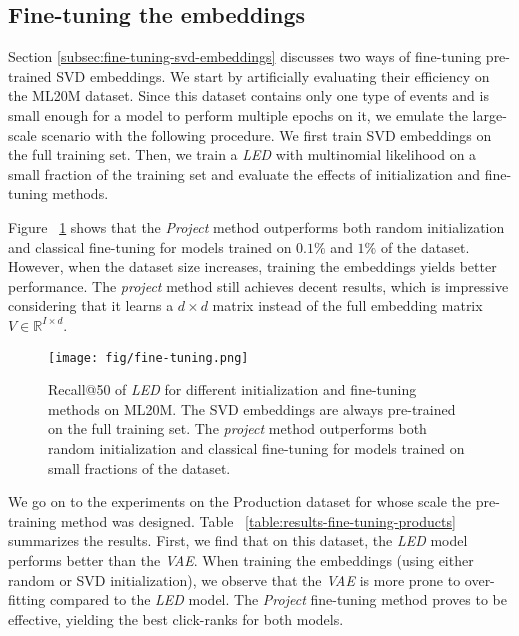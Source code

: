 \documentclass[sigconf]{acmart}
\begin{document}
\subsection{Fine-tuning the embeddings}
\label{sec:fine-tuning-results}
Section \ref{subsec:fine-tuning-svd-embeddings} discusses two ways of fine-tuning pre-trained SVD embeddings. We start by artificially evaluating their efficiency on the ML20M dataset. Since this dataset contains only one type of events and is small enough for a model to perform multiple epochs on it, we emulate the large-scale scenario with the following procedure. We first train SVD embeddings on the full training set. Then, we train a \emph{LED} with multinomial likelihood on a small fraction of the training set and evaluate the effects of initialization and fine-tuning methods.

Figure ~\ref{fig:fine-tuning} shows that the \emph{Project} method outperforms both random initialization and classical fine-tuning for models trained on $ 0.1 \% $ and $ 1 \% $ of the dataset. However, when the dataset size increases, training the embeddings yields better performance. The \emph{project} method still achieves decent results, which is impressive considering that it learns a $ d \times d $ matrix instead of the full embedding matrix $ V \in \mathbb{R}^{I \times d} $.

\begin{figure}[h!]
    \centering
    \texttt{[image: fig/fine-tuning.png]}
    \caption{Recall@50 of \emph{LED} for different initialization and fine-tuning methods on ML20M. The SVD embeddings are always pre-trained on the full training set. The \emph{project} method outperforms both random initialization and classical fine-tuning for models trained on small fractions of the dataset.}
    \label{fig:fine-tuning}
\end{figure}

We go on to the experiments on the Production dataset for whose scale the pre-training method was designed. Table ~\ref{table:results-fine-tuning-products} summarizes the results. First, we find that on this dataset, the \emph{LED} model performs better than the \emph{VAE}. When training the embeddings (using either random or SVD initialization), we observe that the \emph{VAE} is more prone to over-fitting compared to the \emph{LED} model. The \emph{Project} fine-tuning method proves to be effective, yielding the best click-ranks for both models.
\end{document}
